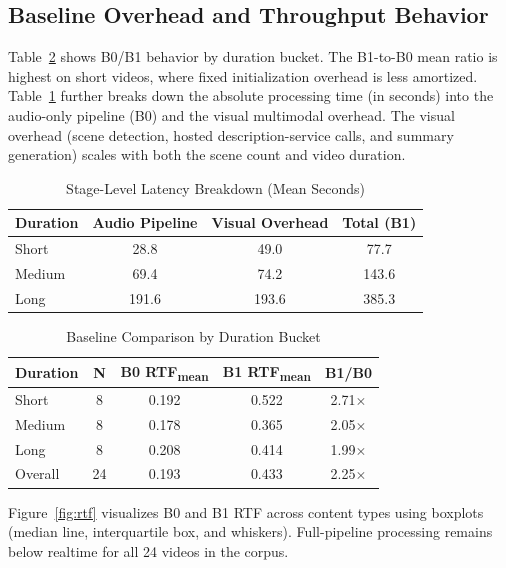 \documentclass[conference]{IEEEtran}
\begin{document}
\subsection{Baseline Overhead and Throughput Behavior}
Table~\ref{tab:duration_baseline} shows B0/B1 behavior by duration bucket. The B1-to-B0 mean ratio is highest on short videos, where fixed initialization overhead is less amortized. Table~\ref{tab:stage_latency} further breaks down the absolute processing time (in seconds) into the audio-only pipeline (B0) and the visual multimodal overhead. The visual overhead (scene detection, hosted description-service calls, and summary generation) scales with both the scene count and video duration.

\begin{table}[t]
\caption{Stage-Level Latency Breakdown (Mean Seconds)}
\label{tab:stage_latency}
\centering
\footnotesize
\setlength{\tabcolsep}{5pt}
\begin{tabular}{lccc}
\toprule
\textbf{Duration} & \textbf{Audio Pipeline} & \textbf{Visual Overhead} & \textbf{Total (B1)} \\
\midrule
Short & 28.8 & 49.0 & 77.7 \\
Medium & 69.4 & 74.2 & 143.6 \\
Long & 191.6 & 193.6 & 385.3 \\
\bottomrule
\end{tabular}
\end{table}

\begin{table}[t]
\caption{Baseline Comparison by Duration Bucket}
\label{tab:duration_baseline}
\centering
\footnotesize
\setlength{\tabcolsep}{4.2pt}
\begin{tabular}{lcccc}
\toprule
\textbf{Duration} & \textbf{N} & \textbf{B0 RTF}\textsubscript{mean} & \textbf{B1 RTF}\textsubscript{mean} & \textbf{B1/B0} \\
\midrule
Short & 8 & 0.192 & 0.522 & 2.71$\times$ \\
Medium & 8 & 0.178 & 0.365 & 2.05$\times$ \\
Long & 8 & 0.208 & 0.414 & 1.99$\times$ \\
Overall & 24 & 0.193 & 0.433 & 2.25$\times$ \\
\bottomrule
\end{tabular}
\end{table}

Figure~\ref{fig:rtf} visualizes B0 and B1 RTF across content types using boxplots (median line, interquartile box, and whiskers). Full-pipeline processing remains below realtime for all 24 videos in the corpus.
\end{document}
